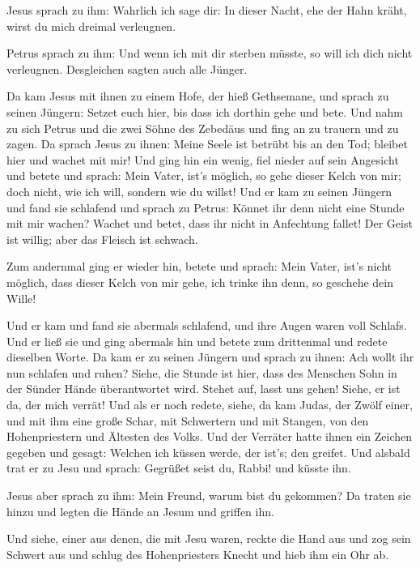  Jesus sprach zu ihm: Wahrlich ich sage dir: In dieser
Nacht, ehe der Hahn kräht, wirst du mich dreimal verleugnen.

 Petrus sprach zu ihm: Und wenn ich mit dir sterben
müsste, so will ich dich nicht verleugnen. Desgleichen sagten auch alle
Jünger.

 Da kam Jesus mit ihnen zu einem Hofe, der hieß
Gethsemane, und sprach zu seinen Jüngern: Setzet euch hier, bis dass ich
dorthin gehe und bete.  Und nahm zu sich Petrus und die
zwei Söhne des Zebedäus und fing an zu trauern und zu zagen.
 Da sprach Jesus zu ihnen: Meine Seele ist betrübt bis an
den Tod; bleibet hier und wachet mit mir!  Und ging hin
ein wenig, fiel nieder auf sein Angesicht und betete und sprach: Mein
Vater, ist's möglich, so gehe dieser Kelch von mir; doch nicht, wie ich
will, sondern wie du willst!  Und er kam zu seinen
Jüngern und fand sie schlafend und sprach zu Petrus: Könnet ihr denn
nicht eine Stunde mit mir wachen?  Wachet und betet, dass
ihr nicht in Anfechtung fallet! Der Geist ist willig; aber das Fleisch
ist schwach.

 Zum andernmal ging er wieder hin, betete und sprach:
Mein Vater, ist's nicht möglich, dass dieser Kelch von mir gehe, ich
trinke ihn denn, so geschehe dein Wille!

 Und er kam und fand sie abermals schlafend, und ihre
Augen waren voll Schlafs.  Und er ließ sie und ging
abermals hin und betete zum drittenmal und redete dieselben Worte.
 Da kam er zu seinen Jüngern und sprach zu ihnen: Ach
wollt ihr nun schlafen und ruhen? Siehe, die Stunde ist hier, dass des
Menschen Sohn in der Sünder Hände überantwortet wird. 
Stehet auf, lasst uns gehen! Siehe, er ist da, der mich verrät!
 Und als er noch redete, siehe, da kam Judas, der Zwölf
einer, und mit ihm eine große Schar, mit Schwertern und mit Stangen, von
den Hohenpriestern und Ältesten des Volks.  Und der
Verräter hatte ihnen ein Zeichen gegeben und gesagt: Welchen ich küssen
werde, der ist's; den greifet.  Und alsbald trat er zu
Jesu und sprach: Gegrüßet seist du, Rabbi! und küsste ihn.

 Jesus aber sprach zu ihm: Mein Freund, warum bist du
gekommen? Da traten sie hinzu und legten die Hände an Jesum und griffen
ihn.

 Und siehe, einer aus denen, die mit Jesu waren, reckte
die Hand aus und zog sein Schwert aus und schlug des Hohenpriesters
Knecht und hieb ihm ein Ohr ab.

